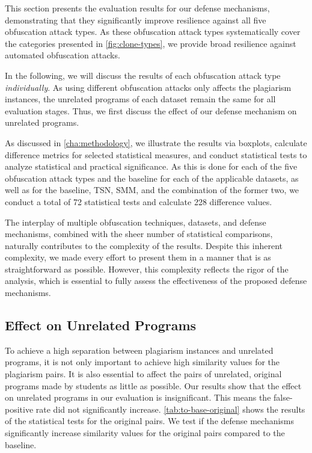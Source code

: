 This section presents the evaluation results for our defense mechanisms, demonstrating that they significantly improve resilience against all five obfuscation attack types. As these obfuscation attack types systematically cover the categories presented in \autoref{fig:clone-types}, we provide broad resilience against automated obfuscation attacks.

In the following, we will discuss the results of each obfuscation attack type \textit{individually}. As using different obfuscation attacks only affects the plagiarism instances, the unrelated programs of each dataset remain the same for all evaluation stages. Thus, we first discuss the effect of our defense mechanism on unrelated programs.

As discussed in \autoref{cha:methodology}, we illustrate the results via boxplots, calculate difference metrics for selected statistical measures, and conduct statistical tests to analyze statistical and practical significance. As this is done for each of the five obfuscation attack types and the baseline for each of the applicable datasets, as well as for the baseline, TSN, SMM, and the combination of the former two, we conduct a total of 72 statistical tests and calculate 228 difference values.

The interplay of multiple obfuscation techniques, datasets, and defense mechanisms, combined with the sheer number of statistical comparisons, naturally contributes to the complexity of the results. Despite this inherent complexity, we made every effort to present them in a manner that is as straightforward as possible. 
However, this complexity reflects the rigor of the analysis, which is essential to fully assess the effectiveness of the proposed defense mechanisms.


 

\subsection{Effect on Unrelated Programs}\label{sec:eval-unrel}
To achieve a high separation between plagiarism instances and unrelated programs, it is not only important to achieve high similarity values for the plagiarism pairs.
It is also essential to affect the pairs of unrelated, original programs made by students as little as possible. 
Our results show that the effect on unrelated programs in our evaluation is insignificant. This means the false-positive rate did not significantly increase.
\autoref{tab:to-base-original} shows the results of the statistical tests for the original pairs. We test if the defense mechanisms significantly increase similarity values for the original pairs compared to the baseline.

